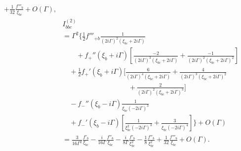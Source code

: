 \documentclass[twocolumn,superscriptaddress]{revtex4-1}
\begin{document}
\begin{align}
+\frac{1}{32}\frac{f'''_b}{\xi_{bc}}+O(\Gamma),\\
&I_{bbc}^{(2)}\nonumber \\
&= \Gamma^2\Biggl\{\frac{1}{2}f'''_{+b}\frac{1}{(2i\Gamma)^2(\xi_{bc}+2i\Gamma)}\nonumber \\
&\qquad+f_+''(\xi_b+i\Gamma)\left[\frac{-2}{(2i\Gamma)^3(\xi_{bc}+2i\Gamma)}+\frac{-1}{(2i\Gamma)^2(\xi_{bc}+2i\Gamma)^2}\right] \nonumber \\ 
&\quad +\frac{1}{2}f_+'(\xi_b+i\Gamma)\Big[\frac{6}{(2i\Gamma)^4(\xi_{bc}+2i\Gamma)}+\frac{4}{(2i\Gamma)^3(\xi_{bc}+2i\Gamma)^2} \nonumber \\
&\hspace{4cm}+\frac{2}{(2i\Gamma)^2(\xi_{bc}+2i\Gamma)^3}\Big] \nonumber \\
&\quad -f_-''(\xi_b-i\Gamma)\frac{1}{\xi_{bc}(-2i\Gamma)^3}\nonumber \\
&\quad+f_-'(\xi_b-i\Gamma)\left[\frac{1}{\xi_{bc}^2(-2i\Gamma)^3}+\frac{3}{\xi_{bc}(-2i\Gamma)^4}\right] \Biggr\}+O(\Gamma) \nonumber \\
&=
\frac{3}{16\Gamma^2}\frac{f'_b}{\xi_{bc}}
-\frac{i}{16\Gamma}\frac{f''_b}{\xi_{bc}}
-\frac{i}{8\Gamma}\frac{f'_b}{\xi_{bc}^2}
-\frac{1}{8}\frac{f''_b}{\xi_{bc}^2}
+\frac{1}{32}\frac{f'''_b}{\xi_{bc}}+O(\Gamma).
\end{align}
\end{document}
